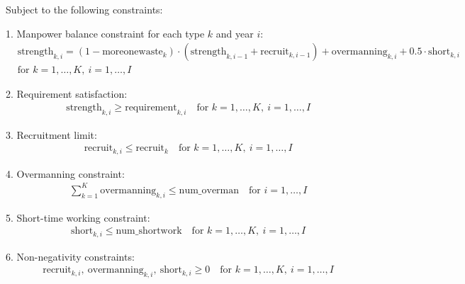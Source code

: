 \documentclass{article}
\begin{document}
Subject to the following constraints:

1. Manpower balance constraint for each type $k$ and year $i$:
\begin{align*}
    & \text{strength}_{k,i} = (1 - \text{moreonewaste}_{k}) \cdot (\text{strength}_{k,i-1} + \text{recruit}_{k,i-1}) + \text{overmanning}_{k,i} + 0.5 \cdot \text{short}_{k,i} \\
    & \text{for } k = 1,\ldots,K, \ i = 1,\ldots,I
\end{align*}

2. Requirement satisfaction:
\begin{align*}
    & \text{strength}_{k,i} \geq \text{requirement}_{k,i} \quad \text{for } k = 1,\ldots,K, \ i = 1,\ldots,I
\end{align*}

3. Recruitment limit:
\begin{align*}
    & \text{recruit}_{k,i} \leq \text{recruit}_{k} \quad \text{for } k = 1,\ldots,K, \ i = 1,\ldots,I
\end{align*}

4. Overmanning constraint:
\begin{align*}
    & \sum_{k=1}^{K} \text{overmanning}_{k,i} \leq \text{num\_overman} \quad \text{for } i = 1,\ldots,I
\end{align*}

5. Short-time working constraint:
\begin{align*}
    & \text{short}_{k,i} \leq \text{num\_shortwork} \quad \text{for } k = 1,\ldots,K, \ i = 1,\ldots,I
\end{align*}

6. Non-negativity constraints:
\begin{align*}
    & \text{recruit}_{k,i}, \ \text{overmanning}_{k,i}, \ \text{short}_{k,i} \geq 0 \quad \text{for } k = 1,\ldots,K, \ i = 1,\ldots,I
\end{align*}
\end{document}
